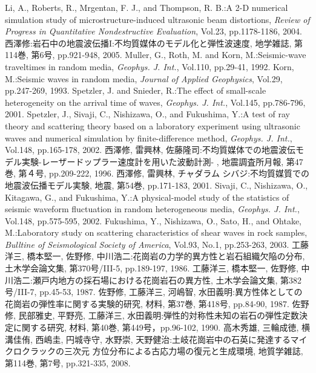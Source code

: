 \documentclass{jsce}
\begin{document}
\begin{thebibliography}{99}
\begin{spacing}{1.175}
	Li, A., Roberts, R., Mrgentan, F. J., and Thompson, R. B.:A 2-D numerical simulation study of microstructure-induced  ultrasonic beam distortions,
	{\it Review of Progress in Quantitative Nondestructive Evaluation}, Vol.23, pp.1178-1186, 2004.
	西澤修:岩石中の地震波伝播I:不均質媒体のモデル化と弾性波速度, 地学雑誌, 第114巻, 第6号,  pp.921-948,  2005.
	Muller, G., Roth, M. and Korn, M.:Seismic-wave traveltimes in random media,
	{\it Geophys. J. Int.}, Vol.110, pp.29-41, 1992. 
	Korn, M.:Seismic waves in random media, 
	{\it Journal of Applied Geophysics}, Vol.29, pp.247-269, 1993.
	Spetzler, J. and Snieder, R.:The effect of small-scale heterogeneity on the arrival time of waves, 
	{\it Geophys. J. Int.}, Vol.145, pp.786-796, 2001. 
	Spetzler, J., Sivaji, C., Nishizawa, O., and Fukushima, Y.:A test of ray theory and scattering theory based on
	a laboratory experiment using ultrasonic waves and numerical 
\newpage
	simulation by finite-difference method, 
	{\it Geophys. J. Int.}, Vol.148, pp.165-178, 2002. 
	西澤修, 雷興林, 佐藤隆司:不均質媒体での地震波伝モデル実験-レーザードップラー速度計を用いた波動計測-
	, 地震調査所月報, 第47巻, 第４号, pp.209-222, 1996.
	西澤修, 雷興林, チャダラム シバジ:不均質媒質での地震波伝播モデル実験, 
	地震, 第54巻, pp.171-183, 2001.
	Sivaji, C., Nishizawa, O., Kitagawa, G., and Fukushima, Y.:A physical-model study of the statistics of seismic waveform fluctuation in random heterogeneous media, 
	{\it Geophys. J. Int.}, Vol.148, pp.575-595, 2002. 
	Fukushima, Y., Nishizawa, O., Sato, H., and Ohtake, M.:Laboratory study on scattering characteristics of shear waves 
	in rock samples, {\it Bulltine of Seismological Society of America}, Vol.93, No.1, pp.253-263, 2003.
	工藤洋三, 橋本堅一, 佐野修, 中川浩二:花崗岩の力学的異方性と岩石組織欠陥の分布,
	土木学会論文集, 第370号/III-5, pp.189-197, 1986.
	工藤洋三, 橋本堅一, 佐野修, 中川浩二:瀬戸内地方の採石場における花崗岩石の異方性, 
	土木学会論文集, 第382号/III-7, pp.45-53, 1987.
	佐野修, 工藤洋三, 河嶋智, 水田義明:異方性体としての花崗岩の弾性率に関する実験的研究, 
	材料, 第37巻, 第418号, pp.84-90, 1987.
	佐野修, 民部雅史, 平野亮, 工藤洋三, 水田義明:弾性的対称性未知の岩石の弾性定数決定に関する研究, 
	材料, 第40巻, 第449号，pp.96-102, 1990.
	高木秀雄, 三輪成徳, 横溝佳侑, 西嶋圭, 円城寺守, 水野崇, 天野健治:土岐花崗岩中の石英に発達するマイクロクラックの三次元
	方位分布による古応力場の復元と生成環境, 地質学雑誌, 第114巻, 第7号, pp.321-335, 2008.
\end{spacing}
\end{thebibliography}
\end{document}
